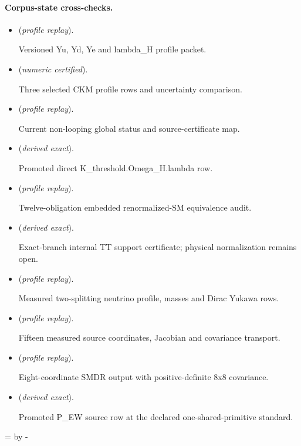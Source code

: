 \documentclass[11pt]{article}
\begin{document}
\paragraph{Corpus-state cross-checks.}
\begin{itemize}
\setlength{\itemsep}{0.25em}
\item {} (\emph{profile replay}).\par Versioned Yu, Yd, Ye and lambda\_H profile packet.
\item {} (\emph{numeric certified}).\par Three selected CKM profile rows and uncertainty comparison.
\item {} (\emph{profile replay}).\par Current non-looping global status and source-certificate map.
\item {} (\emph{derived exact}).\par Promoted direct K\_threshold.Omega\_H.lambda row.
\item {} (\emph{profile replay}).\par Twelve-obligation embedded renormalized-SM equivalence audit.
\item {} (\emph{derived exact}).\par Exact-branch internal TT support certificate; physical normalization remains open.
\item {} (\emph{profile replay}).\par Measured two-splitting neutrino profile, masses and Dirac Yukawa rows.
\item {} (\emph{profile replay}).\par Fifteen measured source coordinates, Jacobian and covariance transport.
\item {} (\emph{profile replay}).\par Eight-coordinate SMDR output with positive-definite 8x8 covariance.
\item {} (\emph{derived exact}).\par Promoted P\_EW source row at the declared one-shared-primitive standard.
\end{itemize}

\par\begingroup{}=\pagegoal\advance{} by -\pagetotal\ifdim\dimen0<7\baselineskip\newpage\fi\endgroup
\end{document}

